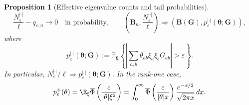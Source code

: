 \documentclass{article}
\newcommand{\Prob}{\mathbb{P}}
\newcommand{\weak}{\Rightarrow}
\newcommand{\bB}{\mathbf{B}}
\newcommand{\bG}{\mathbf{G}}
\newcommand{\barPhi}{\overline{\Phi}}
\newtheorem{proposition}[theorem]{Proposition}
\theoremstyle{definition}
\theoremstyle{remark}
\begin{document}
\begin{proposition}[Effective eigenvalue counts and tail probabilities]
\begin{equation}
    \frac{N_\varepsilon^{|\cdot|}}{\ell}-q_{\varepsilon,n}
    \longrightarrow 0
    \quad\text{in probability},
    \qquad
    \left(\bB_n,\frac{N_\varepsilon^{|\cdot|}}{\ell}\right)
    \weak
    \left(\bB(\bG),
    p_\varepsilon^{|\cdot|}(\boldsymbol{\theta};\bG)\right),
    \label{eq:conditional-effective-count}
\end{equation}
where
\[
    p_\varepsilon^{|\cdot|}(\boldsymbol{\theta};\bG)
    :=
    \Prob_{\boldsymbol{\xi}}
    \left\{
    \left|
    \sum_{a,b}\theta_{ab}\xi_a\xi_bG_{ab}
    \right|>\varepsilon
    \right\}.
\]
In particular,
$N_\varepsilon^{|\cdot|}/\ell\weak
p_\varepsilon^{|\cdot|}(\boldsymbol{\theta};\bG)$.  In the rank-one case,
\begin{equation}
    p_\varepsilon^+(\theta)
    =
    \E_{\xi}
    \barPhi\left(\frac{\varepsilon}{|\theta|\xi^2}\right)
    =
    \int_0^\infty
    \barPhi\left(\frac{\varepsilon}{|\theta|x}\right)
    \frac{e^{-x/2}}{\sqrt{2\pi x}}\,dx.
    \label{eq:rank-one-tail-formula}
\end{equation}
\label{prop:eigenvalue-effective-counts}
\end{proposition}
\end{document}
